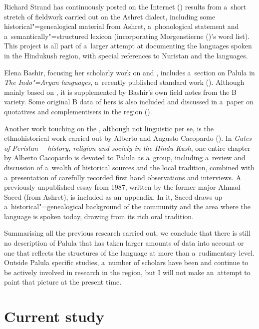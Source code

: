 Richard Strand has continuously posted on the Internet (\citeyear{strand1997/2015})
results from a~short stretch of fieldwork carried out on the Ashret dialect, including
some historical"=genealogical material from Ashret, a~phonological statement and
a~semantically"=structured lexicon (incorporating Morgenstierne (\citeyear{morgenstierne1941})'s word list). This project is
all part of a~larger attempt at documenting the languages spoken in the Hindukush region, with
special references to Nuristan and the \iliNuristani languages.


Elena Bashir, focusing her scholarly work on \iliKalasha and \iliKhowar, includes a~section on Palula in
\textit{The Indo"=Aryan languages}, a~recently published standard work
(\citeyear{bashir2003}). Although mainly based on \citet{morgenstierne1941}, it is supplemented by
Bashir's own field notes from the B variety. Some original B data of hers is also included and
discussed in a~paper on quotatives and complementisers in the region (\citeyear{bashir1996}).


Another work touching on the , although not linguistic per se, is the ethnohistorical work
carried out by Alberto and Augusto Cacopardo (\citeyear{cacopardo2001}). In \textit{Gates of
  Peristan~-- history, religion and society in the Hindu Kush}, one entire chapter by Alberto
Cacopardo is devoted to Palula as a~group, including a~review and discussion of a~wealth of
historical sources and the local tradition, combined with a~presentation of carefully recorded first
hand observations and interviews. A previously unpublished essay from 1987, written by the former
major Ahmad Saeed (from Ashret), is included as an~appendix. In it, Saeed draws up
a~historical"=genealogical background of the community and the area where the language is spoken
today, drawing from its rich oral tradition.

\largerpage
Summarising all the previous research carried out, we conclude that there is still no description of
Palula that has taken larger amounts of data into account or one that reflects the structures of the
language at more than a~rudimentary level. Outside Palula specific studies, a~number of scholars have been and continue to be actively involved
in research in the region, but I will not make an~attempt to paint that picture at the present time.


\section{Current study}
\label{sec:1-6}

